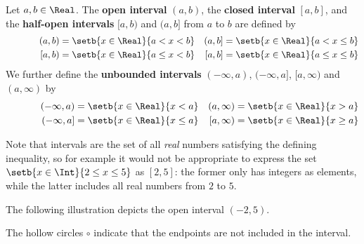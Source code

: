 \begin{definition}
\label{defIntervals}
\nindex{abint3}{$(a,b]$}{half-open interval}
\nindex{abint4}{$[a,b)$}{half-open interval}
Let $a,b \in \Real$. The \textbf{open interval} $(a,b)$, the \textbf{closed interval} $[a,b]$, and the \textbf{half-open intervals} $[a,b)$ and $(a,b]$ from $a$ to $b$ are defined by
\begin{align*}
\hspace{35pt} (a,b) &= \setb{x \in \Real}{a < x < b}
&
(a,b] &= \setb{x \in \Real}{a < x \le b} 
\\
\hspace{35pt} [a,b) &= \setb{x \in \Real}{a \le x < b}
&
[a,b] &= \setb{x \in \Real}{a \le x \le b}
\end{align*}
We further define the \textbf{unbounded intervals} $(-\infty, a)$, $(-\infty, a]$, $[a, \infty)$ and $(a, \infty)$  by
\begin{align*}
\hspace{35pt} (-\infty,a) &= \setb{x \in \Real}{x < a}
&
(a,\infty) &= \setb{x \in \Real}{x > a}
\\
\hspace{35pt} (-\infty, a] &= \setb{x \in \Real}{x \le a} 
&
[a,\infty) &= \setb{x \in \Real}{x \ge a}
\end{align*}
\end{definition}

Note that intervals are the set of all \textit{real} numbers satisfying the defining inequality, so for example it would not be appropriate to express the set $\setb{x \in \Int}{2 \le x \le 5}$ as $[2,5]$: the former only has integers as elements, while the latter includes all real numbers from $2$ to $5$.

\begin{example}
The following illustration depicts the open interval $(-2,5)$.

\vspace{-10pt}
\begin{center}
\end{center}
The hollow circles $\circ$ indicate that the endpoints are not included in the interval.
\end{example}

